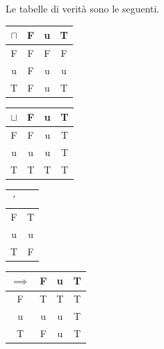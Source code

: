 Le tabelle di verità sono le seguenti.

\begin{table}[b]
    \centering
    \begin{subtable}[t]{0.49 \textwidth}
        \begin{tabular}{c|c|c|c}
            $\sqcap$ & F & u & T \\
            \hline
            F        & F & F & F \\
            u        & F & u & u \\
            T        & F & u & T
        \end{tabular}
    \end{subtable}
    \hspace{\fill}
    \begin{subtable}[t]{0.49 \textwidth}
        
        \begin{tabular}{c|c|c|c}
            $\sqcup$ & F & u & T \\
            \hline
            F        & F & u & T \\
            u        & u & u & T \\
            T        & T & T & T
        \end{tabular}
    \end{subtable}
    \bigskip

    \begin{subtable}[t]{0.49 \textwidth}
        \begin{tabular}{c|c}
            $'$& \\
            \hline
            F  & T \\
            u  & u \\
            T  & F 
        \end{tabular}
    \end{subtable}


    \begin{subtable}[t]{0.49 \textwidth}
        
        \begin{tabular}{c|c|c|c}
            $\implies$ & F & u & T \\
            \hline
            F        & T & T & T \\
            u        & u & u & T \\
            T        & F & u & T
        \end{tabular}
    \end{subtable}
    \bigskip
    
\end{table}


